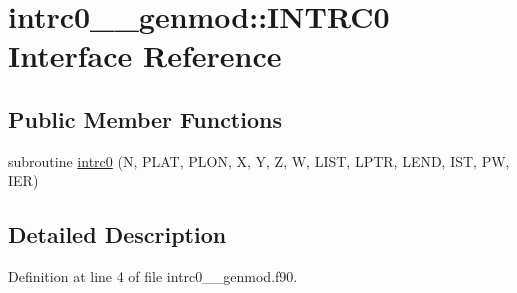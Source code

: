 \hypertarget{interfaceintrc0____genmod_1_1INTRC0}{\section{intrc0\+\_\+\+\_\+genmod\+:\+:I\+N\+T\+R\+C0 Interface Reference}
\label{interfaceintrc0____genmod_1_1INTRC0}
}
\subsection*{Public Member Functions}
\begin{DoxyCompactItemize}
\item 
subroutine \hyperlink{interfaceintrc0____genmod_1_1INTRC0_a83b9466cf14458488ca838dbdb42de9c}{intrc0} (N, P\+L\+A\+T, P\+L\+O\+N, X, Y, Z, W, L\+I\+S\+T, L\+P\+T\+R, L\+E\+N\+D, I\+S\+T, P\+W, I\+E\+R)
\end{DoxyCompactItemize}


\subsection{Detailed Description}


Definition at line 4 of file intrc0\+\_\+\+\_\+genmod.\+f90.



